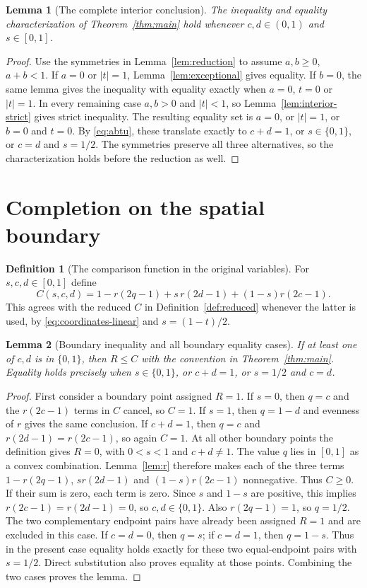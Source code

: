 \documentclass[11pt,a4paper]{article}
\newtheorem{lemma}{Lemma}[section]
\theoremstyle{definition}
\newtheorem{definition}{Definition}[section]
\newcommand{\E}[2]{\refstepcounter{equation}\[#2\tag{\theequation}\label{eq:#1}\]}
\begin{document}
\begin{lemma}[The complete interior conclusion]\label{lem:interior-complete}
The inequality and equality characterization of Theorem~\ref{thm:main} hold whenever $c,d\in(0,1)$ and $s\in[0,1]$.
\end{lemma}
\begin{proof}
Use the symmetries in Lemma~\ref{lem:reduction} to assume $a,b\geq0$, $a+b<1$. If $a=0$ or $|t|=1$, Lemma~\ref{lem:exceptional} gives equality. If $b=0$, the same lemma gives the inequality with equality exactly when $a=0$, $t=0$ or $|t|=1$. In every remaining case $a,b>0$ and $|t|<1$, so Lemma~\ref{lem:interior-strict} gives strict inequality.
The resulting equality set is $a=0$, or $|t|=1$, or $b=0$ and $t=0$. By \eqref{eq:abtu}, these translate exactly to $c+d=1$, or $s\in\{0,1\}$, or $c=d$ and $s=1/2$. The symmetries preserve all three alternatives, so the characterization holds before the reduction as well.
\end{proof}

\section{Completion on the spatial boundary}
\begin{definition}[The comparison function in the original variables]\label{def:originalC}
For $s,c,d\in[0,1]$ define
\E{originalC}{C(s,c,d)=1-r(2q-1)+s\,r(2d-1)+(1-s)r(2c-1).}
This agrees with the reduced $C$ in Definition~\ref{def:reduced} whenever the latter is used, by \eqref{eq:coordinates-linear} and $s=(1-t)/2$.
\end{definition}

\begin{lemma}[Boundary inequality and all boundary equality cases]\label{lem:boundary}
If at least one of $c,d$ is in $\{0,1\}$, then $R\leq C$ with the convention in Theorem~\ref{thm:main}. Equality holds precisely when $s\in\{0,1\}$, or $c+d=1$, or $s=1/2$ and $c=d$.
\end{lemma}
\begin{proof}
First consider a boundary point assigned $R=1$. If $s=0$, then $q=c$ and the $r(2c-1)$ terms in $C$ cancel, so $C=1$. If $s=1$, then $q=1-d$ and evenness of $r$ gives the same conclusion. If $c+d=1$, then $q=c$ and $r(2d-1)=r(2c-1)$, so again $C=1$.
At all other boundary points the definition gives $R=0$, with $0<s<1$ and $c+d\ne1$. The value $q$ lies in $[0,1]$ as a convex combination. Lemma~\ref{lem:r} therefore makes each of the three terms $1-r(2q-1)$, $s r(2d-1)$ and $(1-s)r(2c-1)$ nonnegative. Thus $C\geq0$.
If their sum is zero, each term is zero. Since $s$ and $1-s$ are positive, this implies $r(2c-1)=r(2d-1)=0$, so $c,d\in\{0,1\}$. Also $r(2q-1)=1$, so $q=1/2$. The two complementary endpoint pairs have already been assigned $R=1$ and are excluded in this case. If $c=d=0$, then $q=s$; if $c=d=1$, then $q=1-s$. Thus in the present case equality holds exactly for these two equal-endpoint pairs with $s=1/2$. Direct substitution also proves equality at those points. Combining the two cases proves the lemma.
\end{proof}
\end{document}
